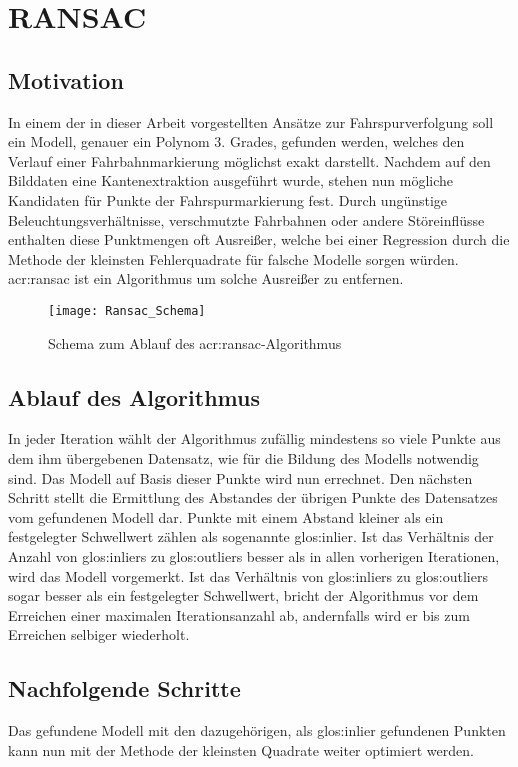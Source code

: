 \section{RANSAC}
\subsection{Motivation}
In einem der in dieser Arbeit vorgestellten Ansätze zur Fahrspurverfolgung soll ein Modell, genauer ein Polynom 3. Grades, gefunden werden, welches den Verlauf einer Fahrbahnmarkierung möglichst exakt darstellt. Nachdem auf den Bilddaten eine Kantenextraktion ausgeführt wurde, stehen nun mögliche Kandidaten für Punkte der Fahrspurmarkierung fest. Durch ungünstige Beleuchtungsverhältnisse, verschmutzte Fahrbahnen oder andere Störeinflüsse enthalten diese Punktmengen oft Ausreißer, welche bei einer Regression durch die Methode der kleinsten Fehlerquadrate für falsche Modelle sorgen würden. \gls{acr:ransac} \autocite{fischler1981random} ist ein Algorithmus um solche Ausreißer zu entfernen.

\begin{figure}[H]
  \centering
  \texttt{[image: Ransac\_Schema]}
  \caption{Schema zum Ablauf des \gls{acr:ransac}-Algorithmus}
  \label{fig:ransac_scheme}
\end{figure}

\subsection{Ablauf des Algorithmus}
In jeder Iteration wählt der Algorithmus zufällig mindestens so viele Punkte aus dem ihm übergebenen Datensatz, wie für die Bildung des Modells notwendig sind. Das Modell auf Basis dieser Punkte wird nun errechnet. Den nächsten Schritt stellt die Ermittlung des Abstandes der übrigen Punkte des Datensatzes vom gefundenen Modell dar. Punkte mit einem Abstand kleiner als ein festgelegter Schwellwert zählen als sogenannte \gls{glos:inlier}. Ist das Verhältnis der Anzahl von \glspl{glos:inlier} zu \glspl{glos:outlier} besser als in allen vorherigen Iterationen, wird das Modell vorgemerkt. Ist das Verhältnis von \glspl{glos:inlier} zu \glspl{glos:outlier} sogar besser als ein festgelegter Schwellwert, bricht der Algorithmus vor dem Erreichen einer maximalen Iterationsanzahl ab, andernfalls wird er bis zum Erreichen selbiger wiederholt.

\subsection{Nachfolgende Schritte}
Das gefundene Modell mit den dazugehörigen, als \gls{glos:inlier} gefundenen Punkten kann nun mit der Methode der kleinsten Quadrate weiter optimiert werden.




